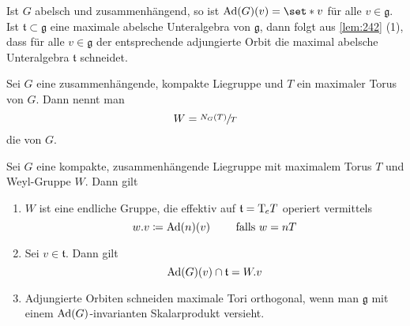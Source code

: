 Ist $G$ abelsch und zusammenhängend, so ist $\Ad(G)(v) = \set*{v}$ für alle $v \in \mathfrak{g}$.
Ist $\mathfrak{t} \subset \mathfrak{g}$ eine maximale abelsche Unteralgebra von $\mathfrak{g}$, dann folgt aus \autoref{lem:242} (1), dass für alle $v \in \mathfrak{g}$ der entsprechende adjungierte Orbit die maximal abelsche Unteralgebra $\mathfrak{t}$ schneidet.

\begin{definition}[{name=[Weyl-Gruppe]}]
	Sei $G$ eine zusammenhängende, kompakte Liegruppe und $T$ ein maximaler Torus von $G$.
	Dann nennt man
	\[
		W = \sfrac{N_G(T)}{T}
	\]
	die  von $G$. 
\end{definition}

\begin{satz}[{name=[Weyl-Gruppe und adjungierte Orbiten]}]
	Sei $G$ eine kompakte, zusammenhängende Liegruppe mit maximalem Torus $T$ und Weyl-Gruppe $W$.
	Dann gilt
	\begin{enumerate}[1)]
		\item $W$ ist eine endliche Gruppe, die effektiv auf $\mathfrak{t} = \mathrm{T}\mkern-0.85mu_e T$ operiert vermittels
		\[
			w.v \coloneqq \operatorname{Ad}(n)(v) \qquad \text{ falls } w = nT 
		\]
		\item Sei $v \in \mathfrak{t}$.
		Dann gilt 
		\[
			\operatorname{Ad}(G)(v) \cap \mathfrak{t} = W.v
		\]
		\item Adjungierte Orbiten schneiden maximale Tori orthogonal, wenn man $\mathfrak{g}$ mit einem $\operatorname{Ad}(G)$-invarianten Skalarprodukt versieht.
	\end{enumerate}
\end{satz}
